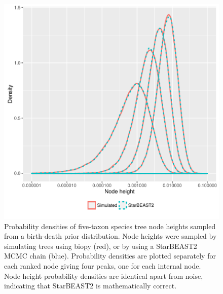 \documentclass[12pt]{article}
\begin{document}
\begin{figure}[htb!]
\centering
\includegraphics[width=16cm]{species_node_heights.pdf}
\caption
{Probability densities of five-taxon species tree node heights sampled from a
birth-death prior distribution. Node heights were sampled by simulating trees
using biopy (red), or by using a StarBEAST2 MCMC chain (blue). Probability
densities are plotted separately for each ranked node giving four peaks, one
for each internal node. Node height probability densities are identical apart
from noise, indicating that StarBEAST2 is mathematically correct.}
\label{fig:speciesNodeHeights}
\end{figure}

\clearpage
\end{document}
